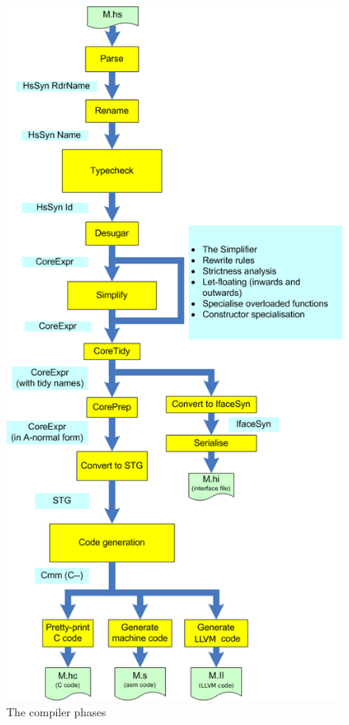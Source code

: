 \documentclass{article}
\begin{document}
\begin{figure}
\begin{center}
\includegraphics[scale=0.3]{HscPipe2.png}
\end{center}
\caption{The compiler phases}
\label{f:pipeline}
\end{figure}
\end{document}
